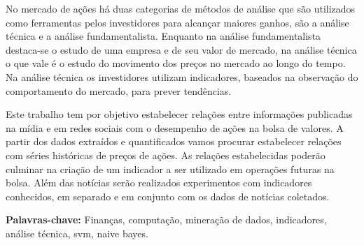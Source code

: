 \begin{resumo}

    No mercado de ações há duas categorias de métodos de análise que são utilizados como ferramentas pelos investidores para alcançar maiores ganhos, são a análise técnica e a análise fundamentalista. Enquanto na análise fundamentalista destaca-se o estudo de uma empresa e de seu valor de mercado, na análise técnica o que vale é o estudo do movimento dos preços no mercado ao longo do tempo. Na análise técnica os investidores utilizam indicadores, baseados na  observação do comportamento do mercado, para prever tendências.

Este trabalho tem por objetivo estabelecer relações entre informações publicadas na mídia e em redes sociais com o desempenho de ações na bolsa de valores. A partir dos dados extraídos e quantificados vamos procurar estabelecer relações com séries históricas de preços de ações. As relações estabelecidas poderão culminar na criação de um indicador a ser utilizado em operações futuras na bolsa. Além das notícias serão realizados experimentos com indicadores conhecidos, em separado e em conjunto com os dados de notícias coletados.



    \textbf{Palavras-chave:} Finanças, computação, mineração de dados, indicadores, análise técnica, svm, naive bayes.
\end{resumo}
